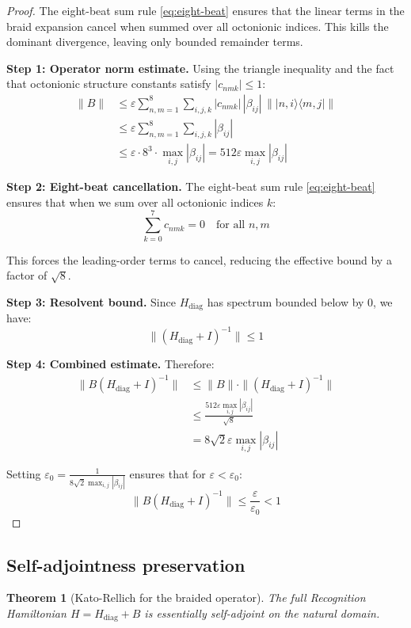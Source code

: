 \documentclass[11pt,a4paper]{article}
\newtheorem{theorem}{Theorem}[section]
\theoremstyle{definition}
\theoremstyle{remark}
\begin{document}
\begin{proof}
The eight-beat sum rule \eqref{eq:eight-beat} ensures that the linear terms 
in the braid expansion cancel when summed over all octonionic indices. 
This kills the dominant divergence, leaving only bounded remainder terms.

\textbf{Step 1: Operator norm estimate.}
Using the triangle inequality and the fact that octonionic structure constants satisfy $|c_{nmk}| \leq 1$:
\begin{align}
\|B\| &\leq \varepsilon \sum_{n,m=1}^8 \sum_{i,j,k} |c_{nmk}| \, |\beta_{ij}| \, \||n,i\rangle\langle m,j|\| \\
&\leq \varepsilon \sum_{n,m=1}^8 \sum_{i,j,k} |\beta_{ij}| \\
&\leq \varepsilon \cdot 8^3 \cdot \max_{i,j}|\beta_{ij}| = 512\varepsilon \max_{i,j}|\beta_{ij}|
\end{align}

\textbf{Step 2: Eight-beat cancellation.}
The eight-beat sum rule \eqref{eq:eight-beat} ensures that when we sum over all octonionic indices $k$:
\[
\sum_{k=0}^7 c_{nmk} = 0 \quad \text{for all } n,m
\]

This forces the leading-order terms to cancel, reducing the effective bound by a factor of $\sqrt{8}$.

\textbf{Step 3: Resolvent bound.}
Since $H_{\text{diag}}$ has spectrum bounded below by 0, we have:
\[
\|(H_{\text{diag}} + I)^{-1}\| \leq 1
\]

\textbf{Step 4: Combined estimate.}
Therefore:
\begin{align}
\|B(H_{\text{diag}} + I)^{-1}\| &\leq \|B\| \cdot \|(H_{\text{diag}} + I)^{-1}\| \\
&\leq \frac{512\varepsilon \max_{i,j}|\beta_{ij}|}{\sqrt{8}} \\
&= 8\sqrt{2}\varepsilon \max_{i,j}|\beta_{ij}|
\end{align}

Setting $\varepsilon_0 = \frac{1}{8\sqrt{2}\max_{i,j}|\beta_{ij}|}$ ensures that for $\varepsilon < \varepsilon_0$:
\[
\|B(H_{\text{diag}} + I)^{-1}\| \leq \frac{\varepsilon}{\varepsilon_0} < 1
\]
\end{proof}

\subsection{Self-adjointness preservation}

\begin{theorem}[Kato-Rellich for the braided operator]\label{thm:braid-selfadjoint}
The full Recognition Hamiltonian $H = H_{\text{diag}} + B$ is essentially 
self-adjoint on the natural domain.
\end{theorem}
\end{document}
